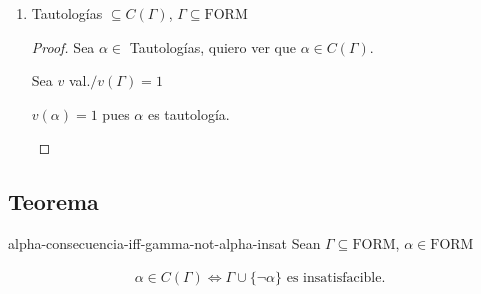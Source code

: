 \begin{enumerate}
\begin{enumerate}
\begin{proof}
\begin{itemize}
                \medskip

                $v(\Gamma)=1$ es absurdo pues $\Gamma$ es insatisfacible.

                El mismo vino de suponer que había una fórmula que no está
                en las consecuencias de $\Gamma$.
        \end{itemize}

        De esta manera probamos que $C(\Gamma)$ son todas las fórmulas.

        \end{proof}

        \bigskip

        Otra manera:
        \begin{proof} \phantom{.}
        
            Sea $v$ valuación.

            \begin{gather*}
                \underbrace{(\underbrace{v(\Gamma) = 1}_{\text{Falso}}
                \implies v(\alpha) = 1)}_{\text{Verdadero}}
            \end{gather*}
        \end{proof}

    \item Tautologías $\subseteq C(\Gamma)$, $\Gamma \subseteq \mathrm{FORM}$

    \begin{proof} \phantom{.}
    
        Sea $\alpha \in$ Tautologías, quiero ver que $\alpha \in C(\Gamma)$.

        Sea $v$ val.$/v(\Gamma) = 1$

        \begin{center}
            $v(\alpha)=1$ pues $\alpha$ es tautología.
        \end{center}
    \end{proof}
\end{enumerate}

\end{enumerate}

\subsection{Teorema}

\begin{teorema}{}{alpha-consecuencia-iff-gamma-not-alpha-insat}
    Sean $\Gamma \subseteq \mathrm{FORM}$, $\alpha \in \mathrm{FORM}$

    \medskip

    \begin{gather*}
        \alpha \in C(\Gamma) \iff 
        \Gamma \cup \{ \neg \alpha \} \text{ es insatisfacible.}
    \end{gather*}
\end{teorema}

